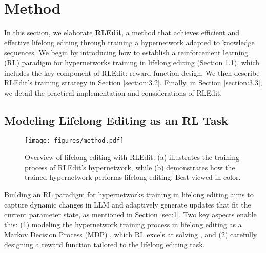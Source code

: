 \section{Method}
In this section, we elaborate \textbf{RLEdit}, a method that achieves efficient and effective lifelong editing through training a hypernetwork adapted to knowledge sequences. We begin by introducing how to establish a reinforcement learning (RL) paradigm for hypernetworks training in lifelong editing (Section \ref{section:3.1}), which includes the key component of RLEdit: reward function design. We then describe RLEdit's training strategy in Section \ref{section:3.2}. Finally, in Section \ref{section:3.3}, we detail the practical implementation and considerations of RLEdit.


\subsection{Modeling Lifelong Editing as an RL Task}
\label{section:3.1}

\begin{figure*}
    \centering
    \texttt{[image: figures/method.pdf]}
    \caption{Overview of lifelong editing with RLEdit. (a) illustrates the training process of RLEdit's hypernetwork, while (b) demonstrates how the trained hypernetwork performs lifelong editing. Best viewed in color.}
    \label{fig:method}
\end{figure*}

Building an RL paradigm for hypernetworks training in lifelong editing aims to capture dynamic changes in LLM and adaptively generate updates that fit the current parameter state, as mentioned in Section \ref{sec:1}. Two key aspects enable this: (1) modeling the hypernetwork training process in lifelong editing as a Markov Decision Process (MDP) \cite{mdp,mdp-plus}, which RL excels at solving \cite{rl}, and (2) carefully designing a reward function tailored to the lifelong editing task.

